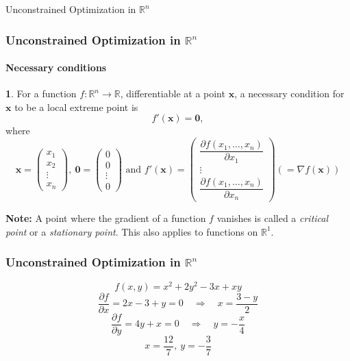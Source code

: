 \documentclass[10pt]{beamer}
\theoremstyle{definition}
\newtheorem{Fact}{\translate{Fact}}
\begin{document}
\begin{section}{Unconstrained Optimization in $ \mathbb{R}^n $}\label{sec:Rn}

\begin{frame}[fragile]
\frametitle{Unconstrained Optimization in $ \mathbb{R}^n $}
\framesubtitle{Necessary conditions}
\begin{Fact}
For a function $ f: \mathbb{R}^n \rightarrow \mathbb{R}$, differentiable at a point $ \mathbf{x} $, a necessary condition for $ \mathbf{x} $ to be a local extreme point is \[ f'(\mathbf{x}) = \mathbf{0}, \]
where \[ \mathbf{x} = \left( \begin{array}{c}
x_1 \\
x_2\\
\vdots \\
x_n
\end{array}\right),~\mathbf{0} = \left( \begin{array}{c}
0 \\
0 \\
\vdots \\
0
\end{array}\right)\text{ and }  f'(\mathbf{x})  = \left( \begin{array}{c}
\dfrac{\partial f(x_1,\ldots,x_n)}{\partial x_1}\\
\vdots \\
\dfrac{\partial f(x_1,\ldots,x_n)}{\partial x_n}
\end{array}\right)(= \nabla f(\mathbf{x})) \]
\label{fc:NCsRn}
\end{Fact}

\textbf{Note:} A point where the gradient of a function $ f $ vanishes is called a \emph{critical point} or a \emph{stationary point}. This also applies to functions on $ \mathbb{R}^1 $.
\end{frame}

\begin{frame}[fragile]
\frametitle{Unconstrained Optimization in $ \mathbb{R}^n $}
\begin{example}
\[ f(x,y) = x^2 +2y^2-3x+xy \]
\[ \frac{\partial f}{\partial x} = 2x-3+y=0\quad \Rightarrow \quad x=\frac{3-y}{2} \]
\[ \frac{\partial f}{\partial y} = 4y+x = 0\quad \Rightarrow \quad y = -\frac{x}{4}\]
\[ x=\frac{12}{7},~y=-\frac{3}{7} \]
\label{ex:locminR2}
\end{example}
\end{frame}


\end{section}
\end{document}
